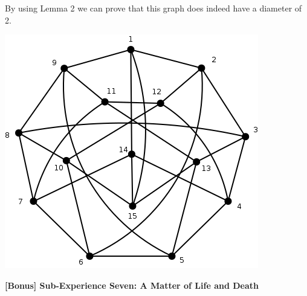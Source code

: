 \documentclass[10pt,a4paper]{report}
\begin{document}
		By using Lemma 2 we can prove that this graph does indeed have a diameter of 2.  
		\begin{center}
			\includegraphics[scale=.5]{e6.png}
			\newline
			\newline
		\end{center}
	\textbf{[Bonus] Sub-Experience Seven: A Matter of Life and Death}\\	
	
		\begin{center}

		\end{center}
\end{document}
